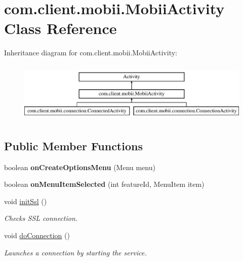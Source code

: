 \hypertarget{classcom_1_1client_1_1mobii_1_1_mobii_activity}{\section{com.\-client.\-mobii.\-Mobii\-Activity Class Reference}
\label{classcom_1_1client_1_1mobii_1_1_mobii_activity}
}
Inheritance diagram for com.\-client.\-mobii.\-Mobii\-Activity\-:\begin{figure}[H]
\begin{center}
\leavevmode
\includegraphics[height=2.937063cm]{classcom_1_1client_1_1mobii_1_1_mobii_activity}
\end{center}
\end{figure}
\subsection*{Public Member Functions}
\begin{DoxyCompactItemize}
\item 
\hypertarget{classcom_1_1client_1_1mobii_1_1_mobii_activity_a0836b260cafe34827c192750b6c1abfb}{boolean {\bfseries on\-Create\-Options\-Menu} (Menu menu)}\label{classcom_1_1client_1_1mobii_1_1_mobii_activity_a0836b260cafe34827c192750b6c1abfb}

\item 
\hypertarget{classcom_1_1client_1_1mobii_1_1_mobii_activity_a51e1e94e77fe327bfe983abe57ecf86b}{boolean {\bfseries on\-Menu\-Item\-Selected} (int feature\-Id, Menu\-Item item)}\label{classcom_1_1client_1_1mobii_1_1_mobii_activity_a51e1e94e77fe327bfe983abe57ecf86b}

\item 
void \hyperlink{classcom_1_1client_1_1mobii_1_1_mobii_activity_a86fde24f024ea569700d1169eede0d5a}{init\-Ssl} ()
\begin{DoxyCompactList}\small\item\em Checks S\-S\-L connection. \end{DoxyCompactList}\item 
\hypertarget{classcom_1_1client_1_1mobii_1_1_mobii_activity_aa3ea3b53ab108a0486ae73120f109db9}{void \hyperlink{classcom_1_1client_1_1mobii_1_1_mobii_activity_aa3ea3b53ab108a0486ae73120f109db9}{do\-Connection} ()}\label{classcom_1_1client_1_1mobii_1_1_mobii_activity_aa3ea3b53ab108a0486ae73120f109db9}

\begin{DoxyCompactList}\small\item\em Launches a connection by starting the service. \end{DoxyCompactList}\end{DoxyCompactItemize}
